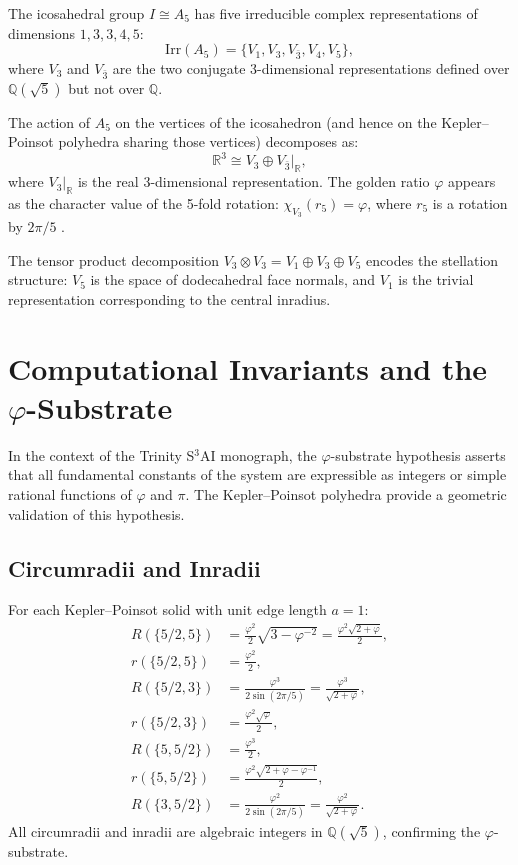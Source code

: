 The icosahedral group $I \cong A_5$ has five irreducible complex
representations of dimensions $1, 3, 3, 4, 5$:
\[
  \text{Irr}(A_5) = \{V_1, V_3, V_{\bar3}, V_4, V_5\},
\]
where $V_3$ and $V_{\bar3}$ are the two conjugate
3-dimensional representations defined over $\mathbb{Q}(\sqrt5)$
but not over $\mathbb{Q}$.

The action of $A_5$ on the vertices of the icosahedron (and
hence on the Kepler–Poinsot polyhedra sharing those vertices)
decomposes as:
\[
  \mathbb{R}^3 \cong V_3 \oplus V_{\bar3}|_{\mathbb{R}},
\]
where $V_3|_{\mathbb{R}}$ is the real 3-dimensional
representation.  The golden ratio $\varphi$ appears as the
character value of the 5-fold rotation:
$\chi_{V_3}(r_5) = \varphi$, where $r_5$ is a rotation by
$2\pi/5$ \cite{coxeter_regular_polytopes}.

The tensor product decomposition $V_3 \otimes V_3 = V_1 \oplus V_3 \oplus V_5$
encodes the stellation structure: $V_5$ is the space of
dodecahedral face normals, and $V_1$ is the trivial
representation corresponding to the central inradius.

\section{Computational Invariants and the \texorpdfstring{$\varphi$}{φ}-Substrate}
\label{sec:computational-invariants}

In the context of the Trinity S$^3$AI monograph, the
$\varphi$-substrate hypothesis asserts that all fundamental
constants of the system are expressible as integers or simple
rational functions of $\varphi$ and $\pi$.  The Kepler–Poinsot
polyhedra provide a geometric validation of this hypothesis.

\subsection{Circumradii and Inradii}
\label{ssec:radii-phi}

For each Kepler–Poinsot solid with unit edge length $a=1$:
\begin{align*}
  R(\{5/2,5\}) &= \frac{\varphi^2}{2}\sqrt{3-\varphi^{-2}} = \frac{\varphi^2\sqrt{2+\varphi}}{2},\\
  r(\{5/2,5\}) &= \frac{\varphi^2}{2},\\
  R(\{5/2,3\}) &= \frac{\varphi^3}{2\sin(2\pi/5)} = \frac{\varphi^3}{\sqrt{2+\varphi}},\\
  r(\{5/2,3\}) &= \frac{\varphi^2\sqrt{\varphi}}{2},\\
  R(\{5,5/2\}) &= \frac{\varphi^3}{2},\\
  r(\{5,5/2\}) &= \frac{\varphi^2\sqrt{2+\varphi-\varphi^{-1}}}{2},\\
  R(\{3,5/2\}) &= \frac{\varphi^2}{2\sin(2\pi/5)} = \frac{\varphi^2}{\sqrt{2+\varphi}}.
\end{align*}
All circumradii and inradii are algebraic integers in
$\mathbb{Q}(\sqrt5)$, confirming the $\varphi$-substrate.

